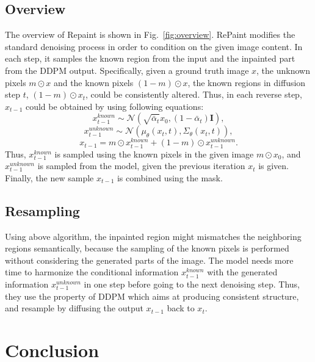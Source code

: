 \documentclass[10pt,twocolumn,letterpaper]{article}
\begin{document}
\subsection{Overview}
The overview of Repaint is shown in Fig.~\ref{fig:overview}.
RePaint modifies the standard denoising process in order to condition on the given image content.
In each step, it samples the known region from the input and the inpainted part from the DDPM output.
Specifically, given a ground truth image $x$, the unknown pixels $m \odot x$ and the known pixels $(1-m) \odot x$, the known regions in diffusion step $t$, $(1-m) \odot x_t$, could be consistently altered.
Thus, in each reverse step, $x_{t-1}$ could be obtained by using following equations:
%
\begin{equation}
    x^{known}_{t-1} \sim \mathcal{N}(\sqrt{\bar{\alpha}_t}x_0, (1-\bar{\alpha}_t)\mathbf{I}),
\end{equation}
\begin{equation}
    x^{unknown}_{t-1} \sim \mathcal{N}(\mu_\theta(x_t, t), \Sigma_\theta(x_t, t)),
\end{equation}
\begin{equation}
    x_{t-1} = m \odot x^{known}_{t-1} + (1-m) \odot x^{unknown}_{t-1}.
\end{equation}
%
Thus, $x^{known}_{t-1}$ is sampled using the known pixels in the given image $m \odot x_0$, and $x^{unknown}_{t-1}$ is sampled from the model, given the previous iteration $x_t$ is given.
Finally, the new sample $x_{t-1}$ is combined using the mask.

\subsection{Resampling}
Using above algorithm, the inpainted region might mismatches the neighboring regions semantically, because the sampling of the known pixels is performed without considering the generated parts of the image.
The model needs more time to harmonize the conditional information $x^{known}_{t-1}$ with the generated information $x^{unknown}_{t-1}$ in one step before going to the next denoising step.
Thus, they use the property of DDPM which aims at producing consistent structure, and resample by diffusing the output $x_{t-1}$ back to $x_t$.


\section{Conclusion}
\end{document}
